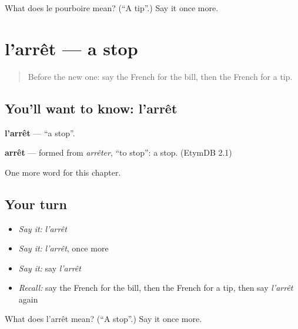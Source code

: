 \begin{tcolorbox}[breakable,colback=teal!4,colframe=teal!35!black,title={Before you move on}]
What does le pourboire mean? (\textquotedblleft{}A tip\textquotedblright{}.) Say it once more.
\end{tcolorbox}
\section[l'arrêt]{l'arrêt — a stop}

\label{lesson:FR-C247-arret}



\begin{quote}
Before the new one: say the French for the bill, then the French for a tip.
\end{quote}

\subsection*{You'll want to know: l'arrêt}
\textbf{l'arrêt} — \textquotedblleft{}a stop\textquotedblright{}.

\begin{cousinweb}
\textbf{arrêt} — formed from \emph{arrêter}, \textquotedblleft{}to stop\textquotedblright{}: a stop. (EtymDB 2.1)
\end{cousinweb}

\begin{grammarlens}[title={What you've built}]
One more word for this chapter.
\end{grammarlens}

\subsection*{Your turn}
\begin{itemize}
\raggedright
  \item \emph{Say it:} \emph{l'arrêt}
  \item \emph{Say it:} \emph{l'arrêt}, once more
  \item \emph{Say it:} say \emph{l'arrêt}
  \item \emph{Recall:} say the French for the bill, then the French for a tip, then say \emph{l'arrêt} again
\end{itemize}

\begin{tcolorbox}[breakable,colback=teal!4,colframe=teal!35!black,title={Before you move on}]
What does l'arrêt mean? (\textquotedblleft{}A stop\textquotedblright{}.) Say it once more.
\end{tcolorbox}
